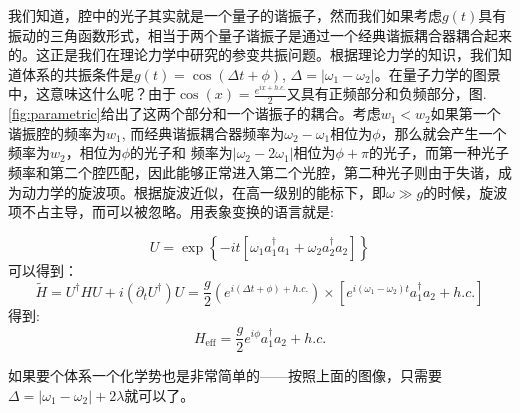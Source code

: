 \documentclass[supercite]{HustGraduPaper}
\begin{document}
   我们知道，腔中的光子其实就是一个量子的谐振子，然而我们如果考虑$g(t)$具有振动的三角函数形式，相当于两个量子谐振子是通过一个经典谐振耦合器耦合起来的。这正是我们在理论力学中研究的参变共振问题。根据理论力学的知识，我们知道体系的共振条件是$g(t) = \cos(\Delta t + \phi)$, $\Delta = |\omega_1 - \omega_2|$。在量子力学的图景中，这意味这什么呢？由于$\cos(x) = \frac{e^{ix + h.c.}}{2}$又具有正频部分和负频部分，图.\ref{fig:parametric}给出了这两个部分和一个谐振子的耦合。考虑$w_1 <w_2$如果第一个谐振腔的频率为$w_1$, 而经典谐振耦合器频率为$\omega_2 - \omega_1$相位为$\phi$，那么就会产生一个频率为$w_2$，相位为$\phi$的光子和 频率为$|\omega_2 - 2 \omega_1|$相位为$\phi+\pi$的光子，而第一种光子频率和第二个腔匹配，因此能够正常进入第二个光腔，第二种光子则由于失谐，成为动力学的旋波项。根据旋波近似，在高一级别的能标下\cite{Wang2016}，即$\omega \gg g$的时候，旋波项不占主导，而可以被忽略。用表象变换的语言就是\cite{Roushan2017a}:
   
   \begin{equation}
   	U = \exp\left\{ -it \left[ \omega_1 a^\dagger_1 a_1 + \omega_2 a_2^\dagger a_2 \right]  \right\}
   \end{equation}
   可以得到：
   \begin{equation}
   	\tilde{H} = U^\dagger H U + i(\partial_t U^\dagger) U =\frac{g}{2}(e^{i(\Delta t+ \phi) + h.c.}) \times [e^{i(\omega_1 - \omega_2)t} a_1^\dagger a_2 + h.c.]
   \end{equation}
   得到:
   \begin{equation}
   H_{\text{eff}} = \frac{g}{2} e^{i\phi} a_1^\dagger a_2 + h.c.
   \end{equation}
   
   如果要个体系一个化学势也是非常简单的——按照上面的图像，只需要$\Delta = |\omega_1 - \omega_2| + 2\lambda$就可以了\cite{Roushan2017a}。
   
\end{document}

